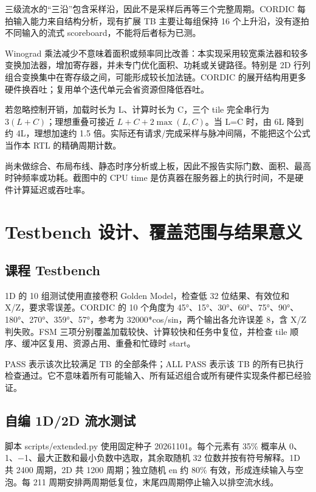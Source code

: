 \documentclass[
  10pt,
  a4paper,
]{article}
\begin{document}
三级流水的``三沿''包含采样沿，因此不是采样后再等三个完整周期。CORDIC
每拍输入能力来自结构分析，现有扩展 TB 主要让每组保持 16
个上升沿，没有逐拍不同输入的流式 scoreboard，不能将后者标为已测。

Winograd
乘法减少不意味着面积或频率同比改善：本实现采用较宽乘法器和较多变换加法器，增加寄存器，并未专门优化面积、功耗或关键路径。特别是
2D 行列组合变换集中在寄存级之间，可能形成较长加法链。CORDIC
的展开结构用更多硬件换吞吐；复用单个迭代单元会省资源但降低吞吐。

若忽略控制开销，加载时长为 L、计算时长为 C，三个 tile 完全串行为
\(3(L+C)\)；理想重叠可接近 \(L+C+2\max(L,C)\)。当 L=C 时，由 6L 降到约
4L，理想加速约 1.5
倍。实际还有请求/完成采样与脉冲间隔，不能把这个公式当作本 RTL
的精确周期计数。

尚未做综合、布局布线、静态时序分析或上板，因此不报告实际门数、面积、最高时钟频率或功耗。截图中的
CPU time 是仿真器在服务器上的执行时间，不是硬件计算延迟或吞吐率。

\section{Testbench
设计、覆盖范围与结果意义}\label{testbench-ux8bbeux8ba1ux8986ux76d6ux8303ux56f4ux4e0eux7ed3ux679cux610fux4e49}

\subsection{课程 Testbench}\label{ux8bfeux7a0b-testbench}

1D 的 10 组测试使用直接卷积 Golden Model，检查低 32 位结果、有效位和
X/Z，要求零误差。CORDIC 的 10 个角度为
45°、15°、30°、60°、75°、90°、180°、270°、359°、57°，参考为
32000*cos/sin，两个输出各允许误差 8，含 X/Z 判失败。FSM
三项分别覆盖加载较快、计算较快和任务中复位，并检查 tile
顺序、缓冲区复用、资源占用、重叠和忙碌时 start。

PASS 表示该次比较满足 TB 的全部条件；ALL PASS 表示该 TB
的所有已执行检查通过。它不意味着所有可能输入、所有延迟组合或所有硬件实现条件都已经验证。

\subsection{自编 1D/2D
流水测试}\label{ux81eaux7f16-1d2d-ux6d41ux6c34ux6d4bux8bd5}

脚本 scripts/extended.py 使用固定种子 20261101。每个元素有 35\% 概率从
0、1、−1、最大正数和最小负数中选取，其余取随机 32 位数并按有符号解释。1D
共 2400 周期，2D 共 1200 周期；独立随机 en 约 80\%
有效，形成连续输入与空泡。每 211
周期安排两周期低复位，末尾四周期停止输入以排空流水线。
\end{document}
